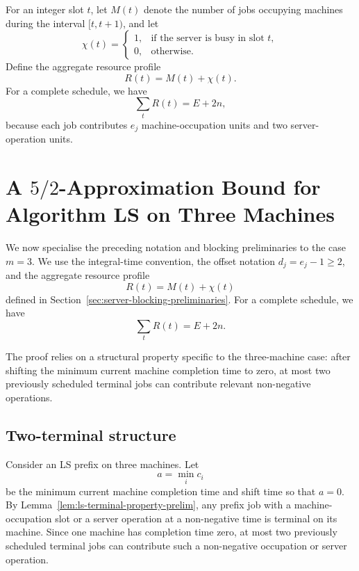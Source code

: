 \documentclass[11pt]{article}
\begin{document}
For an integer slot \(t\), let \(M(t)\) denote the number of jobs occupying
machines during the interval \([t,t+1)\), and let
\[
        \chi(t)=
        \begin{cases}
        1, & \text{if the server is busy in slot }t,\\
        0, & \text{otherwise}.
        \end{cases}
\]
Define the aggregate resource profile
\[
        R(t)=M(t)+\chi(t).
\]
For a complete schedule, we have
\[
        \sum_t R(t)=E+2n,
\]
because each job contributes \(e_j\) machine-occupation units and two
server-operation units.



\section{A \(5/2\)-Approximation Bound for Algorithm LS on Three Machines}
\label{sec:ls-three-machines-five-halves}

We now specialise the preceding notation and blocking preliminaries to the case
\(m=3\). We use the integral-time convention, the offset notation
\(d_j=e_j-1\ge2\), and the aggregate resource profile
\[
        R(t)=M(t)+\chi(t)
\]
defined in Section~\ref{sec:server-blocking-preliminaries}. For a complete
schedule, we have 
\[
        \sum_t R(t)=E+2n .
\]

The proof relies on a structural property specific to the three-machine case:
after shifting the minimum current machine completion time to zero, at most two
previously scheduled terminal jobs can contribute relevant non-negative operations.
\subsection{Two-terminal structure}

Consider an LS prefix on three machines. Let
\[
        a=\min_i c_i
\]
be the minimum current machine completion time and shift time so that \(a=0\).
By Lemma~\ref{lem:ls-terminal-property-prelim}, any prefix job with a
machine-occupation slot or a server operation at a non-negative time is terminal
on its machine. Since one machine has completion time zero, at most two
previously scheduled terminal jobs can contribute such a non-negative occupation or server operation.
\end{document}
